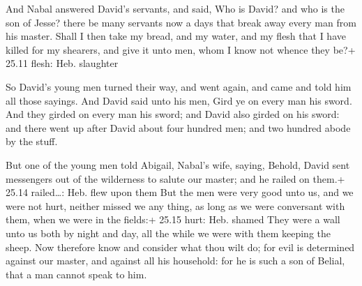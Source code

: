  And Nabal answered David's servants, and said, Who is
David? and who is the son of Jesse? there be many servants now a days
that break away every man from his master.  Shall I then
take my bread, and my water, and my flesh that I have killed for my
shearers, and give it unto men, whom I know not whence they be?+ 25.11
flesh: Heb. slaughter

 So David's young men turned their way, and went again, and
came and told him all those sayings.  And David said unto
his men, Gird ye on every man his sword. And they girded on every man
his sword; and David also girded on his sword: and there went up after
David about four hundred men; and two hundred abode by the stuff.

 But one of the young men told Abigail, Nabal's wife,
saying, Behold, David sent messengers out of the wilderness to salute
our master; and he railed on them.+ 25.14 railed\ldots: Heb. flew upon
them  But the men were very good unto us, and we were not
hurt, neither missed we any thing, as long as we were conversant with
them, when we were in the fields:+ 25.15 hurt: Heb. shamed 
They were a wall unto us both by night and day, all the while we were
with them keeping the sheep.  Now therefore know and
consider what thou wilt do; for evil is determined against our master,
and against all his household: for he is such a son of Belial, that a
man cannot speak to him.

